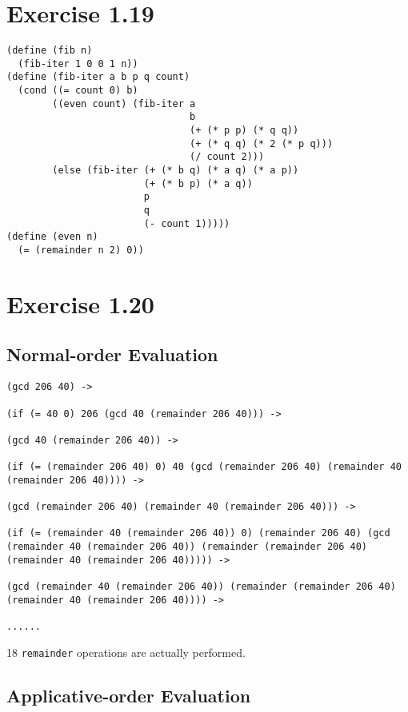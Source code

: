 \documentclass[../main.tex]{subfiles}
\begin{document}
\section{Exercise 1.19}

\begin{lstlisting}
(define (fib n)
  (fib-iter 1 0 0 1 n))
(define (fib-iter a b p q count)
  (cond ((= count 0) b)
        ((even count) (fib-iter a
                                b
                                (+ (* p p) (* q q))
                                (+ (* q q) (* 2 (* p q)))
                                (/ count 2)))
        (else (fib-iter (+ (* b q) (* a q) (* a p))
                        (+ (* b p) (* a q))
                        p
                        q
                        (- count 1)))))
(define (even n)
  (= (remainder n 2) 0))
\end{lstlisting}

\section{Exercise 1.20}

\subsection*{Normal-order Evaluation}

\begin{lstlisting}
(gcd 206 40) ->

(if (= 40 0) 206 (gcd 40 (remainder 206 40))) ->

(gcd 40 (remainder 206 40)) ->

(if (= (remainder 206 40) 0) 40 (gcd (remainder 206 40) (remainder 40 (remainder 206 40)))) ->

(gcd (remainder 206 40) (remainder 40 (remainder 206 40))) ->

(if (= (remainder 40 (remainder 206 40)) 0) (remainder 206 40) (gcd (remainder 40 (remainder 206 40)) (remainder (remainder 206 40) (remainder 40 (remainder 206 40))))) ->

(gcd (remainder 40 (remainder 206 40)) (remainder (remainder 206 40) (remainder 40 (remainder 206 40)))) ->

......
\end{lstlisting}

18 \lstinline{remainder} operations are actually performed.

\subsection*{Applicative-order Evaluation}
\end{document}
